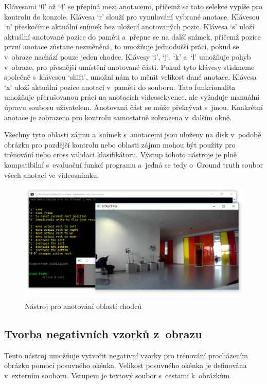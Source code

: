 Klávesami `0' až `4' se přepíná mezi anotacemi, přičemž se tato selekce vypíše pro kontrolu do konzole. Klávesa `r' slouží pro vynulování vybrané anotace. Klávesou `n' přeskočíme aktuální snímek bez uložení anotovaných pozic. Klávesa `s' uloží aktuální anotované pozice do paměti a~přepne se na další snímek, přičemž pozice první anotace zůstane nezměněná, to umožňuje jednodušší práci, pokud se v~obraze nachází pouze jeden chodec. Klávesy `i', `j', `k' a~`l' umožňuje pohyb v~obraze, pro přesnější umístění anotované části. Pokud tyto klávesy stiskneme společně s~klávesou `shift', umožní nám to měnit velikost dané anotace. Klávesa `x' uloží aktuální pozice anotací v~paměti do souboru. Tato funkcionalita umožňuje přerušovanou práci na anotacích videosekvence, ale vyžaduje manuální úpravu souboru uživatelem. Anotovaná část se může překrývat s~jinou. Konkrétní anotace je zobrazena pro kontrolu samostatně zobrazena v~dalším okně.

Všechny tyto oblasti zájmu a~snímek s~anotacemi jsou uloženy na disk v~podobě obrázku pro pozdější kontrolu nebo oblasti zájmu mohou být použity pro trénování nebo cross validaci klasifikátoru. Výstup tohoto nástroje je plně kompatibilní s~evaluační funkcí programu a~jedná se tedy o~Ground truth soubor všech anotací ve videosnímku.
 \begin{figure}[H]
\centering
\includegraphics[width=13.5cm]{figures/annotation_example}
\caption{Nástroj pro anotování oblastí chodců}
\label{tool_anotate}
\end{figure}

\subsection{Tvorba negativních vzorků z~obrazu}
Tento nástroj umožňuje vytvořit negativní vzorky pro trénování procházením obrázku pomocí posuvného okénka. Velikost posuvného okénka je definována v~externím souboru. Vstupem je textový soubor s~cestami k~obrázkům.
